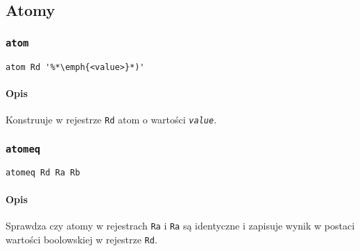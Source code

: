 \subsection{Atomy}
\label{viua_vm_ops_atom}

\subsubsection{\texttt{atom}}

\begin{lstlisting}
atom Rd '%*\emph{<value>}*)'
\end{lstlisting}

\paragraph*{Opis} Konstruuje w rejestrze \texttt{Rd} atom o wartości
\texttt{\emph{value}}.

\subsubsection{\texttt{atomeq}}

\begin{lstlisting}
atomeq Rd Ra Rb
\end{lstlisting}

\paragraph*{Opis} Sprawdza czy atomy w rejestrach \texttt{Ra} i \texttt{Ra} są
identyczne i zapisuje wynik w postaci wartości boolowskiej w rejestrze
\texttt{Rd}.
